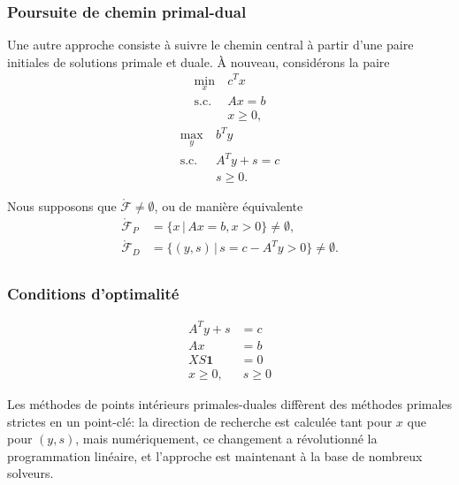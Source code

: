 \documentclass[usepdftitle=false, aspectratio=169]{beamer}
\def\bone{\boldsymbol{1}}
\begin{document}
\begin{frame}
\frametitle{Poursuite de chemin primal-dual}

Une autre approche consiste à suivre le chemin central à partir d'une paire initiales de solutions primale et duale.
À nouveau, considérons la paire
\begin{equation}
\begin{aligned}
\min_x\ & c^T x \\
\mbox{s.c. } & Ax = b \\
& x \geq 0,
\end{aligned}
\tag{P}
\end{equation}
\begin{equation}
\begin{aligned}
\max_y \  & b^T y \\
\mbox{s.c. } & A^T y + s = c \\
& s \geq 0.
\end{aligned}
\tag{D}
\end{equation}

Nous supposons que $\mathring{\mathcal{F}} \ne \emptyset$, ou de manière équivalente
\begin{align*}
	\mathring{\mathcal{F}}_P &= \lbrace x \,|\, Ax = b, x > 0 \rbrace \ne \emptyset, \\
	\mathring{\mathcal{F}}_D &= \lbrace (y,s) \,|\, s = c-A^Ty > 0 \rbrace \ne \emptyset. \\
\end{align*}

\end{frame}

\begin{frame}
\frametitle{Conditions d'optimalité}

\begin{align*}
A^T y + s &= c \\
Ax &= b \\
XS\bone &= 0 \\
x \geq 0,&\ s \geq 0
\end{align*}

\mbox{}

Les méthodes de points intérieurs primales-duales diffèrent des méthodes primales strictes en un point-clé: la direction de recherche est calculée tant pour $x$ que pour $(y,s)$, mais numériquement, ce changement a révolutionné la programmation linéaire, et l'approche est maintenant à la base de nombreux solveurs.

\end{frame}
\end{document}
